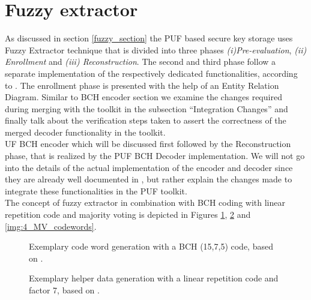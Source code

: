 \section{Fuzzy extractor}
As discussed in section \ref{fuzzy_section} the PUF based secure key storage uses Fuzzy Extractor technique that is divided into three phases \emph{(i)Pre-evaluation}, \emph{(ii) Enrollment} and \emph{(iii) Reconstruction}. The second and third phase follow a separate implementation of the respectively dedicated functionalities, according to \cite{10}. The enrollment phase is presented with the help of an Entity Relation Diagram. Similar to BCH encoder
section we examine the changes required during merging with the toolkit in the subsection ``Integration Changes'' and finally talk about the verification steps taken to assert the correctness of the merged decoder functionality in the toolkit.\\UF BCH encoder which will be discussed first followed by the Reconstruction phase, that is
realized by the PUF BCH Decoder implementation. We will not go into the details of the actual implementation of the encoder and decoder since they are already well documented in \cite{71}, but rather explain the changes made to integrate these functionalities in the PUF toolkit.\\

The concept of fuzzy extractor in combination with BCH coding with linear repetition code and majority voting is depicted in Figures \ref{img:4_BCH_concept}, \ref{img:4_LR_HD} and \ref{img:4_MV_codewords}.

\begin{figure}[h]
\centering
{}
\caption{Exemplary code word generation with a BCH (15,7,5) code, based on \cite{10}.}
\label{img:4_BCH_concept}
\end{figure}

\begin{figure}[h]
\centering
{}
\caption{Exemplary helper data generation with a linear repetition code and factor 7, based on \cite{10}.}
\label{img:4_LR_HD}
\end{figure}

